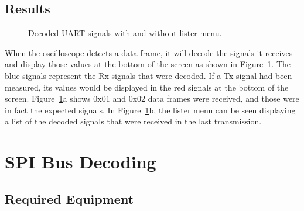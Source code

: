 \documentclass{article}
\begin{document}

  \subsection{Results}

  \begin{figure}[ht]
    \caption{Decoded UART signals with and without lister menu.}
    \label{fig:uart_bus}
  \end{figure}

  When the oscilloscope detects a data frame, it will decode the signals it
  receives and display those values at the bottom of the screen as shown in
  Figure~\ref{fig:uart_bus}. The blue signals represent the Rx signals that were
  decoded. If a Tx signal had been measured, its values would be displayed in
  the red signals at the bottom of the screen. Figure~\ref{fig:uart_bus}a shows
  0x01 and 0x02 data frames were received, and those were in fact the expected
  signals. In Figure~\ref{fig:uart_bus}b, the lister menu can be seen displaying
  a list of the decoded signals that were received in the last transmission.

  \section{SPI Bus Decoding}

  \subsection{Required Equipment}
\end{document}
